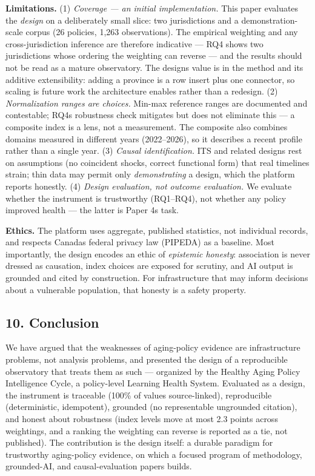 \documentclass[
  11pt,
]{article}
\begin{document}
\textbf{Limitations.} (1) \emph{Coverage --- an initial implementation.}
This paper evaluates the \emph{design} on a deliberately small slice:
two jurisdictions and a demonstration-scale corpus (26 policies, 1,263
observations). The empirical weighting and any cross-jurisdiction
inference are therefore indicative --- RQ4 shows two jurisdictions whose
ordering the weighting can reverse --- and the results should not be
read as a mature observatory. The design\textquotesingle s value is in
the method and its additive extensibility: adding a province is a row
insert plus one connector, so scaling is future work the architecture
enables rather than a redesign. (2) \emph{Normalization ranges are
choices.} Min-max reference ranges are documented and contestable;
RQ4\textquotesingle s robustness check mitigates but does not eliminate
this --- a composite index is a lens, not a measurement. The composite
also combines domains measured in different years (2022--2026), so it
describes a recent profile rather than a single year. (3) \emph{Causal
identification.} ITS and related designs rest on assumptions (no
coincident shocks, correct functional form) that real timelines strain;
thin data may permit only \emph{demonstrating} a design, which the
platform reports honestly. (4) \emph{Design evaluation, not outcome
evaluation.} We evaluate whether the instrument is trustworthy
(RQ1--RQ4), not whether any policy improved health --- the latter is
Paper 4\textquotesingle s task.

\textbf{Ethics.} The platform uses aggregate, published statistics, not
individual records, and respects Canada\textquotesingle s federal
privacy law (PIPEDA) as a baseline. Most importantly, the design encodes
an ethic of \emph{epistemic honesty}: association is never dressed as
causation, index choices are exposed for scrutiny, and AI output is
grounded and cited by construction. For infrastructure that may inform
decisions about a vulnerable population, that honesty is a safety
property.

\hypertarget{10-conclusion}{%
\subsection{10. Conclusion}\label{10-conclusion}}

We have argued that the weaknesses of aging-policy evidence are
infrastructure problems, not analysis problems, and presented the design
of a reproducible observatory that treats them as such --- organized by
the Healthy Aging Policy Intelligence Cycle, a policy-level Learning
Health System. Evaluated as a design, the instrument is traceable (100\%
of values source-linked), reproducible (deterministic, idempotent),
grounded (no representable ungrounded citation), and honest about
robustness (index levels move at most 2.3 points across weightings, and
a ranking the weighting can reverse is reported as a tie, not
published). The contribution is the design itself: a durable paradigm
for trustworthy aging-policy evidence, on which a focused program of
methodology, grounded-AI, and causal-evaluation papers builds.
\end{document}
